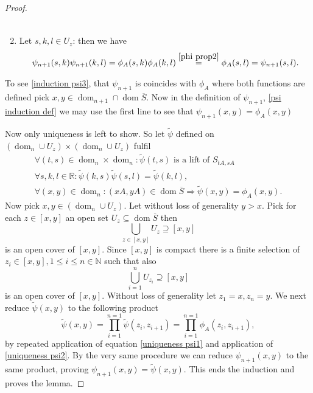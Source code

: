\documentclass[b5paper,draft,openbib,12pt]{memoir}
\DeclareMathOperator{\dom}{dom}
\begin{document}
\begin{proof}
\begin{enumerate}
\begin{align*}
\end{align*}
\item Let \(s,k,l\in U_z\): then we have
\begin{align*}
\psi_{n+1}(s,k)\psi_{n+1}(k,l)=\phi_A(s,k)\phi_A(k,l)\overset{\eqref{phi prop2}}{=}\phi_A(s,l)=\psi_{n+1}(s,l).
\end{align*}
\end{enumerate}
To see \eqref{induction psi3}, that  \(\psi_{n+1}\) is coincides with \(\phi_A\) where both functions are defined pick \(x,y\in \dom_{n+1}\cap\dom\overline{S}\). 
Now in the definition of \(\psi_{n+1}\),  \eqref{psi induction def} we may use the first line to see that \(\psi_{n+1}(x,y)=\phi_A(x,y)\)

Now only uniqueness is left to show. So let \(\tilde{\psi}\) defined on \((\dom_n\cup U_z)\times(\dom_n\cup U_z)\) fulfil 
 \begin{align}\label{uniqueness0}
  \forall (t,s)\in \dom_n\times \dom_n: \tilde{\psi}(t,s) \text{ is a lift of } S_{tA, sA}\\\label{uniqueness psi1}
\forall s,k,l\in\mathbb{R}: \tilde{\psi}(k,s)\tilde{\psi}(s,l)=\tilde{\psi}(k,l),\\\label{uniqueness psi2}
\forall (x,y)\in\dom_n: (xA, yA)\in\dom\overline{S}\Rightarrow  \tilde{\psi}(x,y)=\phi_A(x,y).
\end{align}
Now pick \(x,y \in (\dom_n\cup U_z)\). Let without loss of generality \(y>x\). 
Pick for each \(z \in [x,y]\) an open set \(U_z \subseteq \dom\overline{S}\) then 
\begin{equation}
 \bigcup_{z\in [x,y]} U_z \supseteq [x,y]
\end{equation}
is an open cover of \([x,y]\). Since \([x,y]\) is compact there is a finite selection of \(z_i\in [x,y], 1\le i\le n\in\mathbb{N}\) such that
also 
\begin{equation}
 \bigcup_{i=1}^n U_{z_i}\supseteq [x,y]
\end{equation}
is an open cover of \([x,y]\). Without loss of generality let \(z_1=x, z_n=y\). We next reduce \(\tilde{\psi}(x,y)\) to the following product
\begin{equation}
\tilde{\psi}(x,y)=\prod_{i=1}^{n=1}\tilde{\psi}(z_i,z_{i+1})=\prod_{i=1}^{n=1}\phi_A(z_i,z_{i+1}),
\end{equation}
by repeated application of equation \eqref{uniqueness psi1} and application of \eqref{uniqueness psi2}. By the very same procedure we can reduce \(\psi_{n+1}(x,y)\) to the same 
product, proving \(\psi_{n+1}(x,y)=\tilde{\psi}(x,y)\). This ends the induction and proves the lemma.

\end{proof}
\end{document}
